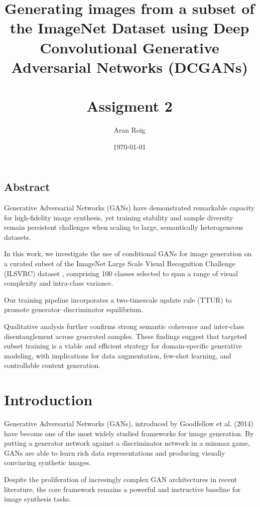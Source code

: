 \documentclass[twocolumn]{article}
\title{Generating images from a subset of the ImageNet Dataset using Deep Convolutional Generative Adversarial
Networks (DCGANs)\\ \\Assigment 2}
\author{Aran Roig}
\date{\today}
\begin{document}
\maketitle

\begin{strip}
\section*{Abstract}


Generative Adversarial Networks (GANs) have demonstrated remarkable capacity for
high-fidelity image synthesis, yet training stability and sample diversity remain
persistent challenges when scaling to large, semantically heterogeneous datasets. 

In this work, we investigate the use of conditional GANs for image generation on a
    curated subset of the ImageNet Large Scale Visual Recognition Challenge (ILSVRC) dataset \cite{russakovsky2014imagenet}, 
comprising 100 classes selected to span a range of visual complexity and intra-class variance.

    Our training pipeline incorporates 
    a two-timescale update rule (TTUR) to promote generator–discriminator equilibrium. 

    Qualitative analysis further confirms strong semantic coherence and inter-class disentanglement across 
    generated samples. These findings suggest that targeted subset training is a viable and efficient 
    strategy for domain-specific generative modeling, with implications for data augmentation, few-shot 
    learning, and controllable content generation.
\vspace{1cm}
\end{strip}
\section{Introduction}

Generative Adversarial Networks (GANs), introduced by Goodfellow et al. (2014) \cite{goodfellow2014generative} have become one of the most
widely studied frameworks for image generation. By putting a generator network against a discriminator
network in a minmax game, GANs are able to learn rich data representations and producing
visually convincing synthetic images.

Despite the proliferation of incresingly complex GAN architectures in recent literature, the core
framework remains a powerful and instructive baseline for image synthesis tasks.
\end{document}
